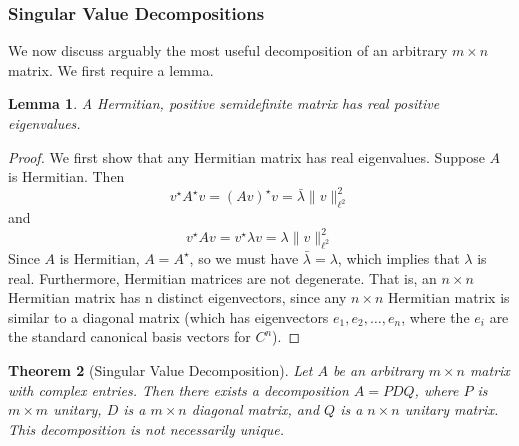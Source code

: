\documentclass[12pt,reqno]{amsart}
\numberwithin{equation}{section}  %
\newtheorem{theorem}{Theorem}[section]
\newtheorem{lemma}[theorem]{Lemma}
\begin{document}
\subsubsection{Singular Value Decompositions}
We now discuss arguably the most useful decomposition of an arbitrary $m \times
n$ matrix. We first require a lemma.
\begin{lemma}
\label{lem:hermite}
A Hermitian, positive semidefinite matrix has real positive eigenvalues.
\end{lemma}
\begin{proof}
We first show that any Hermitian matrix has real eigenvalues. Suppose $A$ is Hermitian.
Then
\begin{equation*}
v^{\star} A^{\star} v = (A v)^{\star} v = \bar{\lambda} \| v \|_{\ell^2}^{2}
\end{equation*}
and
\begin{equation*}
 v^{\star} A v = v^{\star} \lambda v =  \lambda \| v \|_{\ell^2}^{2}
 \end{equation*}
 Since $A$ is Hermitian, $A = A^{\star}$, so we must have $\bar{\lambda} =
\lambda$, which implies that $\lambda$ is real. Furthermore, Hermitian matrices
are not degenerate. That is, an $n \times n$ Hermitian matrix has n distinct
eigenvectors, since any $n \times n$ Hermitian matrix is similar to a diagonal matrix (which
has eigenvectors $e_1, e_2, \ldots, e_n$, where the $e_i$ are the standard 
canonical basis vectors for $C^n$). 
\end{proof}
\begin{theorem}[Singular Value Decomposition]
Let $A$ be an arbitrary $m \times n$ matrix with complex entries.
Then there exists a decomposition $A = PDQ$, where $P$ is $m \times m$ unitary,
$D$ is a $m \times n$ diagonal matrix, and $Q$ is a $n \times n$ unitary matrix.
This decomposition is not necessarily unique.
\end{theorem} 
\end{document}
